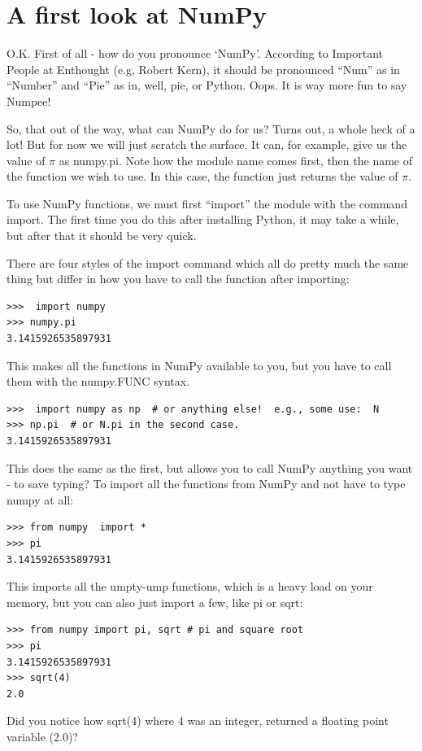 \documentclass[11pt]{book}
\begin{document}
{{\section{A first look at NumPy}

O.K.  First of all - how do you pronounce `NumPy'.  According to Important People at Enthought (e.g, Robert Kern), it should be pronounced ``Num'' as in ``Number'' and ``Pie'' as in, well, pie, or Python.  Oops.  It is way more fun to say Numpee!

So, that out of the way, what can NumPy do for us?  Turns out, a whole heck of a lot!  But for now we will just scratch the surface.   It can, for example, give us the value of $\pi$ as {\color{blue}numpy.pi}.  Note how the module name comes first, then the name of the function we wish to use.  In this case, the function just returns the value of $\pi$.  

To use {\color{blue}NumPy} functions, we must first ``import'' the module with the command {\color{blue}import}.  The first time you do this after installing Python, it may take a while, but after that it should be very quick.  

There are four styles of the import command which all do pretty much the same thing but differ in how you have to call the function after importing: 

{ \color{blue} \begin{verbatim}
>>>  import numpy
>>> numpy.pi
3.1415926535897931
\end{verbatim}}
\noindent
This makes all the functions in NumPy available to you, but you have to call them with the {\color{blue}numpy.FUNC} syntax.

{ \color{blue} \begin{verbatim}
>>>  import numpy as np  # or anything else!  e.g., some use:  N
>>> np.pi  # or N.pi in the second case.
3.1415926535897931
\end{verbatim}}
\noindent
This does the same as the first, but allows you to call NumPy anything you want - to save typing?
\noindent
To import all the functions from NumPy and not have to type numpy at all: 
{ \color{blue} \begin{verbatim}
>>> from numpy  import *
>>> pi
3.1415926535897931
\end{verbatim}}
\noindent
This imports all the umpty-ump functions, which is a heavy load on your memory,  but you can also just import a few, like {\color{blue}pi} or {\color{blue}sqrt}:
{ \color{blue} \begin{verbatim}
>>> from numpy import pi, sqrt # pi and square root
>>> pi
3.1415926535897931
>>> sqrt(4)
2.0
\end{verbatim}
}
\noindent
Did you notice how {\color{blue}sqrt(4)} where 4 was an integer, returned a floating point variable (2.0)?  

}}
\end{document}
